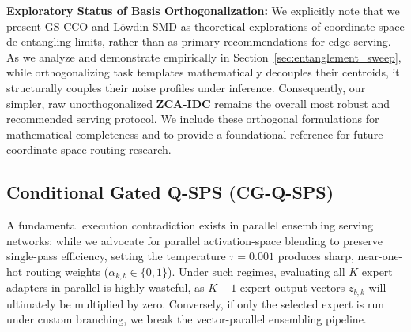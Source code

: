 \textbf{Exploratory Status of Basis Orthogonalization:} We explicitly note that we present GS-CCO and L{\"o}wdin SMD as theoretical explorations of coordinate-space de-entangling limits, rather than as primary recommendations for edge serving. As we analyze and demonstrate empirically in Section~\ref{sec:entanglement_sweep}, while orthogonalizing task templates mathematically decouples their centroids, it structurally couples their noise profiles under inference. Consequently, our simpler, raw unorthogonalized \textbf{ZCA-IDC} remains the overall most robust and recommended serving protocol. We include these orthogonal formulations for mathematical completeness and to provide a foundational reference for future coordinate-space routing research.

\subsection{Conditional Gated Q-SPS (CG-Q-SPS)}
A fundamental execution contradiction exists in parallel ensembling serving networks: while we advocate for parallel activation-space blending to preserve single-pass efficiency, setting the temperature $\tau = 0.001$ produces sharp, near-one-hot routing weights ($\alpha_{k, b} \in \{0, 1\}$). Under such regimes, evaluating all $K$ expert adapters in parallel is highly wasteful, as $K-1$ expert output vectors $z_{b, k}$ will ultimately be multiplied by zero. Conversely, if only the selected expert is run under custom branching, we break the vector-parallel ensembling pipeline.


